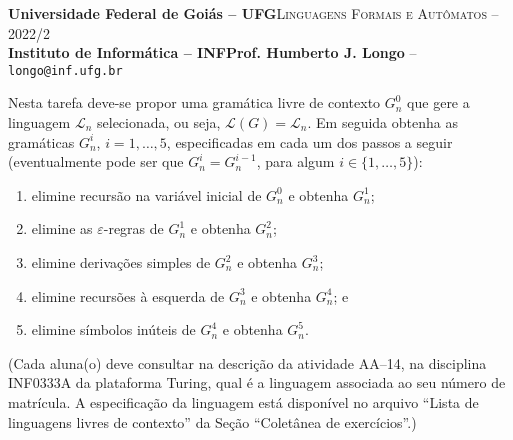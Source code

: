 \documentclass[12pt]{article}
\def\ua{14}
\begin{document}
 \begin{tcolorbox}[rounded corners, colback=blue!3, colframe=blue!40!black]
  \footnotesize\textbf{Universidade Federal de Goiás -- UFG}\hfill \textsc{Linguagens Formais e Autômatos -- 2022/2}\\
  \footnotesize\textbf{Instituto de Informática -- INF\hfill Prof. Humberto J. Longo} -- \scriptsize\texttt{longo@inf.ufg.br}
 \end{tcolorbox}\bigskip
%
\begin{tcolorbox}[rounded corners, colback=blue!2, colframe=blue!40!black, title=\textbf{Atividade AA-\ua}]
 Nesta tarefa deve-se propor uma gramática livre de contexto $G_n^0$ que gere a linguagem $\mathcal{L}_n$ selecionada, ou seja, $\mathcal{L}(G)=\mathcal{L}_n$. Em seguida obtenha as gramáticas $G_n^i$, $i=1,\dots,5$, especificadas em cada um dos passos a seguir (eventualmente pode ser que $G_n^i = G_n^{i-1}$, para algum $i\in\{1,\dots,5\}$):
 \begin{enumerate}
  \item elimine recursão na variável inicial de $G_n^0$ e obtenha $G_n^1$;
  \item elimine as $\varepsilon$-regras de $G_n^1$ e obtenha $G_n^2$;
  \item elimine derivações simples de $G_n^2$ e obtenha $G_n^3$;
  \item elimine recursões à esquerda de $G_n^3$ e obtenha $G_n^4$; e
  \item elimine símbolos inúteis de $G_n^4$ e obtenha $G_n^5$.
 \end{enumerate}
 (Cada aluna(o) deve consultar na descrição da atividade AA--\ua, na disciplina INF0333A da plataforma Turing, qual é a linguagem associada ao seu número de matrícula. A especificação da linguagem está disponível no arquivo ``Lista de linguagens livres de contexto'' da Seção ``Coletânea de exercícios''.)
\end{tcolorbox}\bigskip
\end{document}
